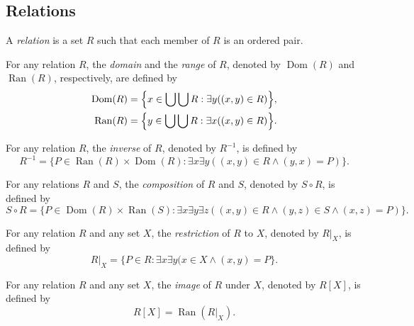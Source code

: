 \documentclass[11pt]{article}
\DeclareMathOperator{\dom}{Dom}
\DeclareMathOperator{\ran}{Ran}
\begin{document}
\subsection{Relations}
\begin{definition}
  A \emph{relation} is a set $R$ such that each member of $R$ is an ordered pair.
\end{definition}

\begin{definition}
  For any relation $R$, the \emph{domain} and the \emph{range} of $R$, denoted by $\dom(R)$ and $\ran(R)$, respectively, are defined by
  \begin{align*}
    \dom(R) &= \Bigl\{x \in \bigcup \bigcup R: \exists y ((x, y) \in R) \Bigr\}, \\
    \ran(R) &= \Bigl\{y \in \bigcup \bigcup R: \exists x ((x, y) \in R) \Bigr\}.
  \end{align*}
\end{definition}

\begin{definition}
  For any relation $R$, the \emph{inverse} of $R$, denoted by $R^{-1}$, is defined by
  \begin{equation*}
    R^{-1} = \{P \in \ran(R) \times \dom(R): \exists x \exists y ((x, y) \in R \wedge (y, x) = P)\}.
  \end{equation*}
\end{definition}

\begin{definition}
  For any relations $R$ and $S$, the \emph{composition} of $R$ and $S$, denoted by $S \circ R$, is defined by
  \begin{equation*}
    S \circ R = \{P \in \dom(R) \times \ran(S): \exists x \exists y \exists z ((x, y) \in R \wedge (y, z) \in S \wedge (x, z) = P)\}.
  \end{equation*}
\end{definition}

\begin{definition}
  For any relation $R$ and any set $X$, the \emph{restriction} of $R$ to $X$, denoted by $R|_X$, is defined by
  \begin{equation*}
    R|_X = \{P \in R: \exists x \exists y (x \in X \wedge (x, y) = P\}.
  \end{equation*}
\end{definition}

\begin{definition}
  For any relation $R$ and any set $X$, the \emph{image} of $R$ under $X$, denoted by $R[X]$, is defined by
  \begin{equation*}
    R[X] = \ran(R|_X).
  \end{equation*}
\end{definition}
\end{document}

